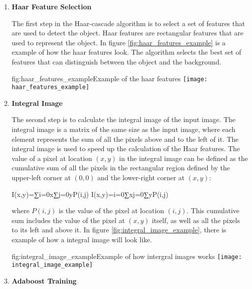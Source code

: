 \begin{enumerate}

    \item \textbf{Haar Feature Selection}

          The first step in the Haar-cascade algorithm is to select a set of features
          that are used to detect the object. Haar features are rectangular features that
          are used to represent the object. In figure \ref{fig:haar_features_example} is
          a example of how the haar features look. The algorithm selects the best set of
          features that can distinguish between the object and the background.

          \begin{linfigure}{fig:haar_features_example}{Example of the haar features}
              \texttt{[image: haar\_features\_example]}
          \end{linfigure}

    \item \textbf{Integral Image}

          The second step is to calculate the integral image of the input image. The
          integral image is a matrix of the same size as the input image, where each
          element represents the sum of all the pixels above and to the left of it. The
          integral image is used to speed up the calculation of the Haar features. The
          value of a pixel at location $(x,y)$ in the integral image can be defined as
          the cumulative sum of all the pixels in the rectangular region defined by the
          upper-left corner at $(0,0)$ and the lower-right corner at $(x,y)$:

          I(x,y)=∑i=0x∑j=0yP(i,j) I(x,y)=i=0∑x​j=0∑y​P(i,j)

          where $P(i,j)$ is the value of the pixel at location $(i,j)$. This cumulative
          sum includes the value of the pixel at $(x,y)$ itself, as well as all the
          pixels to its left and above it. In figure \ref{fig:integral_image_example},
          there is example of how a integral image will look like.

          \begin{linfigure}{fig:integral_image_example}{Example of how intergral images works}
              \texttt{[image: integral\_image\_example]}
          \end{linfigure}

    \item \textbf{Adaboost Training}


\end{enumerate}
